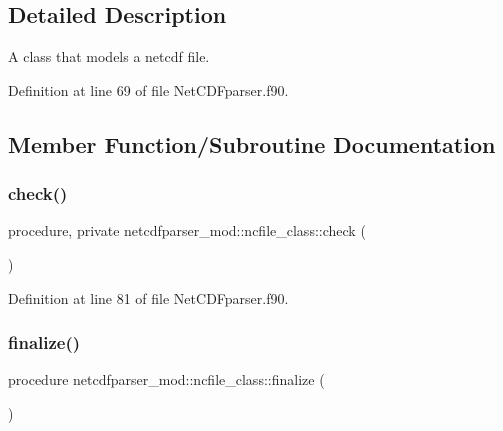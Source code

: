 \subsection{Detailed Description}
A class that models a netcdf file. 

Definition at line 69 of file Net\+C\+D\+Fparser.\+f90.



\subsection{Member Function/\+Subroutine Documentation}
\mbox{\label{structnetcdfparser__mod_1_1ncfile__class_a2b41dc377688a881f9252bd4fc09bec9}} 
\subsubsection{\texorpdfstring{check()}{check()}}
{\footnotesize\ttfamily procedure, private netcdfparser\+\_\+mod\+::ncfile\+\_\+class\+::check (\begin{DoxyParamCaption}{ }\end{DoxyParamCaption})\hspace{0.3cm}{\ttfamily [private]}}



Definition at line 81 of file Net\+C\+D\+Fparser.\+f90.

\mbox{\label{structnetcdfparser__mod_1_1ncfile__class_a62c3404b0742346374753743e349e6f1}} 
\subsubsection{\texorpdfstring{finalize()}{finalize()}}
{\footnotesize\ttfamily procedure netcdfparser\+\_\+mod\+::ncfile\+\_\+class\+::finalize (\begin{DoxyParamCaption}{ }\end{DoxyParamCaption})\hspace{0.3cm}{\ttfamily [private]}}



